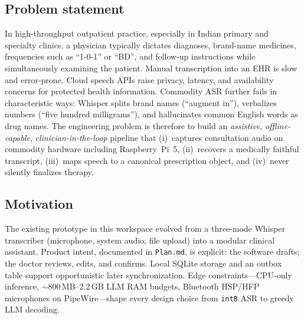 \documentclass[11pt,a4paper]{article}
\begin{document}
\subsection{Problem statement}
In high-throughput outpatient practice, especially in Indian primary and specialty clinics, a physician typically dictates diagnoses, brand-name medicines, frequencies such as ``1-0-1'' or ``BD'', and follow-up instructions while simultaneously examining the patient. Manual transcription into an EHR is slow and error-prone. Cloud speech APIs raise privacy, latency, and availability concerns for protected health information. Commodity ASR further fails in characteristic ways: Whisper splits brand names (``augment in''), verbalizes numbers (``five hundred milligrams''), and hallucinates common English words as drug names. The engineering problem is therefore to build an \emph{assistive}, \emph{offline-capable}, \emph{clinician-in-the-loop} pipeline that (i)~captures consultation audio on commodity hardware including Raspberry~Pi~5, (ii)~recovers a medically faithful transcript, (iii)~maps speech to a canonical prescription object, and (iv)~never silently finalizes therapy.

\subsection{Motivation}
The existing prototype in this workspace evolved from a three-mode Whisper transcriber (microphone, system audio, file upload) into a modular clinical assistant. Product intent, documented in \texttt{Plan.md}, is explicit: the software drafts; the doctor reviews, edits, and confirms. Local SQLite storage and an outbox table support opportunistic later synchronization. Edge constraints---CPU-only inference, $\sim$800\,MB--2.2\,GB LLM RAM budgets, Bluetooth HSP/HFP microphones on PipeWire---shape every design choice from \texttt{int8} ASR to greedy LLM decoding.
\end{document}
